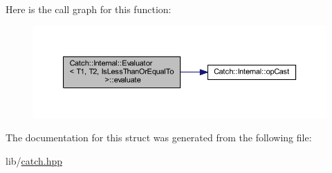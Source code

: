Here is the call graph for this function\+:\nopagebreak
\begin{figure}[H]
\begin{center}
\leavevmode
\includegraphics[width=350pt]{struct_catch_1_1_internal_1_1_evaluator_3_01_t1_00_01_t2_00_01_is_less_than_or_equal_to_01_4_adf269a597e4d82d69f29bcb516297b9b_cgraph}
\end{center}
\end{figure}


The documentation for this struct was generated from the following file\+:\begin{DoxyCompactItemize}
\item 
lib/\hyperlink{catch_8hpp}{catch.\+hpp}\end{DoxyCompactItemize}
